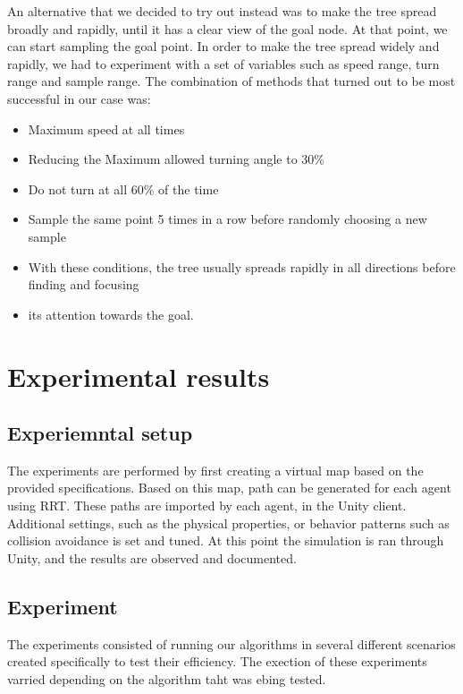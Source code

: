 \documentclass[a4paper,12pt]{article}
\begin{document}
An alternative that we decided to try out instead was to make the tree spread broadly and rapidly, until it has a clear view of the goal node. At that point, we can start sampling the goal point.
In order to make the tree spread widely and rapidly, we had to experiment with a set of variables such as speed range, turn range and sample range. 
The combination of methods  that turned out to be most successful in our case was:
 \begin{itemize}
\item Maximum speed at all times
\item Reducing the Maximum allowed turning angle to 30\%
\item Do not turn at all 60\% of the time
\item Sample the same point 5 times in a row before randomly choosing a new sample
\item With these conditions, the tree usually spreads rapidly in all directions before finding and focusing 
\item its attention towards the goal.
 \end{itemize}


\section{Experimental results}
\label{sec:exps}


\subsection{Experiemntal setup}
The experiments are performed by first creating a virtual map based on the provided specifications. Based on this map, path can be generated for each agent using RRT. These paths are imported by each agent, in the Unity client. Additional settings, such as the physical properties, or behavior patterns such as collision avoidance is set and tuned. At this point the simulation is ran through Unity, and the results are observed and documented. 

\subsection{Experiment}

The experiments consisted of running our algorithms in several different scenarios created specifically to test their efficiency. The exection of these experiments varried depending on the algorithm taht was ebing tested.
\end{document}
